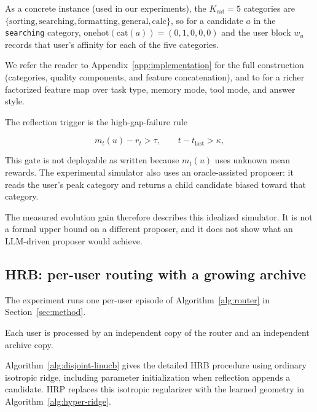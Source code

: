 \documentclass{article} %
\begin{document}
As a concrete instance (used in our experiments), the $K_{\mathrm{cat}}=5$ categories are $\{\text{sorting}, \text{searching}, \text{formatting}, \text{general}, \text{calc}\}$, so for a candidate $a$ in the \texttt{searching} category, $\mathrm{onehot}(\mathrm{cat}(a))=(0,1,0,0,0)$ and the user block $w_u$ records that user's affinity for each of the five categories.

We refer the reader to Appendix~\ref{app:implementation} for the full construction (categories, quality components, and feature concatenation), and to \citet{jin2026personalizing} for a richer factorized feature map over task type, memory mode, tool mode, and answer style.

The reflection trigger is the high-gap-failure rule

\begin{equation}
\label{eq:method-trigger}
m_t(u) - r_t > \tau,\qquad t - t_{\mathrm{last}} > \kappa,
\end{equation}

This gate is not deployable as written because $m_t(u)$ uses unknown mean rewards. The experimental simulator also uses an oracle-assisted proposer: it reads the user's peak category and returns a child candidate biased toward that category.

The measured evolution gain therefore describes this idealized simulator. It is not a formal upper bound on a different proposer, and it does not show what an LLM-driven proposer would achieve.

\subsection{HRB: per-user routing with a growing archive}

\label{app:impl-loop}

The experiment runs one per-user episode of Algorithm~\ref{alg:router} in Section~\ref{sec:method}.

Each user is processed by an independent copy of the router and an independent archive copy.

Algorithm~\ref{alg:disjoint-linucb} gives the detailed HRB procedure using
ordinary isotropic ridge, including parameter initialization when reflection
appends a candidate. HRP replaces this isotropic regularizer with the learned
geometry in Algorithm~\ref{alg:hyper-ridge}.
\end{document}
